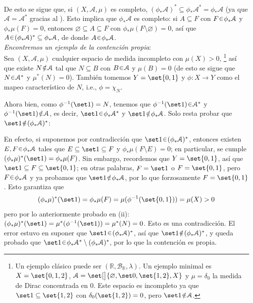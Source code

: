 \begin{sol}
\begin{enumerate}[label = (\roman*)]
De esto se sigue que, si $(X,\mathcal{A},\mu)$ es completo, $(\phi_*\mathcal{A})^* \subseteq \phi_*\mathcal{A}^* = \phi_*\mathcal{A}$ (ya que $\mathcal{A} = \mathcal{A}^*$ gracias al ). Esto implica que $\phi_*\mathcal{A}$ es completo: si $A \subseteq F$ con $F \en\phi_*\mathcal{A}$ y $\phi_*\mu(F) = 0$, entonces $\varnothing \subseteq A \subseteq F$ con $\phi_*\mu(F \setminus\varnothing) = 0$, así que $A \en (\phi_*\mathcal{A})^* \subseteq \phi_*\mathcal{A}$, de donde $A \en \phi_*\mathcal{A}$.
\vspace{1em}\\
\emph{Encontremos un ejemplo de la contención propia}:\\
Sea $(X,\mathcal{A},\mu)$ cualquier espacio de medida incompleto con $\mu(X)>0$,%
\footnote{
    Un ejemplo clásico puede ser $(\mathbb{R},\mathcal{B}_{\mathbb{R}},\lambda)$. Un ejemplo minimal es $X = \set{0,1,2}$, $\mathcal{A} = \set[\big]{\varnothing, \set0, \set{1,2}, X}$ y $\mu = \delta_0$ la medida de Dirac concentrada en $0$. Este espacio es incompleto ya que $\set1 \subseteq\set{1,2}$ con $\delta_0(\set{1,2}) = 0$, pero $\set1 \noten \mathcal{A}$.
}
así que existe $N\noten \mathcal{A}$ tal que $N \subseteq B$ con $B\en\mathcal{A}$ y $\mu(B)=0$ (de esto se sigue que $N\en\mathcal{A}^*$ y $\mu^*(N) = 0$). También tomemos $Y = \set{0,1}$ y $\phi \colon X \to Y$ como el mapeo característico de $N$, i.e., $\phi = \chi_N$.\par
Ahora bien, como $\phi^{-1}(\set1) = N$, tenemos que $\phi^{-1}(\set1) \en \mathcal{A}^*$ y $\phi^{-1}(\set1)\noten \mathcal{A}$, es decir, $\set1 \en \phi_*\mathcal{A}^*$ y $\set1\noten\phi_*\mathcal{A}$. Solo resta probar que $\set1\noten(\phi_*\mathcal{A})^*$:\par
En efecto, si suponemos por contradicción que $\set1\en(\phi_*\mathcal{A})^*$, entonces existen $E,F\en\phi_*\mathcal{A}$ tales que $E \subseteq \set1 \subseteq F$ y $\phi_*\mu(F\setminus E) = 0$; en particular, se cumple $(\phi_*\mu)^*(\set1) = \phi_*\mu(F)$. Sin embargo, recordemos que $Y = \set{0,1}$, así que $\set1 \subseteq F \subseteq \set{0,1}$; en otras palabras, $F = \set1$ o $F=\set{0,1}$, pero $F\en\phi_*\mathcal{A}$ y ya probamos que $\set1\noten\phi_*\mathcal{A}$, por lo que forzosamente $F = \set{0,1}$. Esto garantiza que 
\[
(\phi_*\mu)^*(\set1) = \phi_*\mu(F) =\mu(\phi^{-1}(\set{0,1})) = \mu(X) > 0
\]
pero por lo anteriormente probado en (ii): $(\phi_*\mu)^*(\set1) = \mu^*(\phi^{-1}(\set1)) = \mu^*(N) = 0$. Esto es una contradicción. El error estuvo en suponer que $\set1\en(\phi_*\mathcal{A})^*$, así que $\set1\noten(\phi_*\mathcal{A})^*$, y queda probado que $\set1\en\phi_*\mathcal{A}^*\setminus(\phi_*\mathcal{A})^*$, por lo que la contención es propia.

\end{enumerate}
\end{sol}
